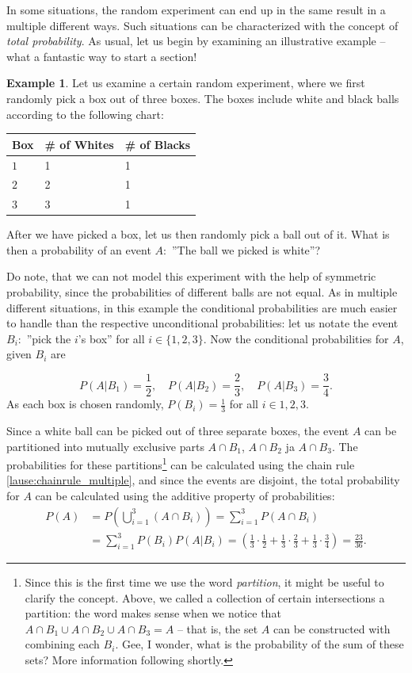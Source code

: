 \documentclass[12pt,a4paper,leqno]{report}
\theoremstyle{plain}
\theoremstyle{definition}
\newtheorem{esim}[equation]{Example}
\begin{document}
In some situations, the random experiment can end up in the same result in a multiple different ways. Such situations can be characterized with the concept of \emph{total probability}. As usual, let us begin by examining an illustrative example -- what a fantastic way to start a section! 

\begin{esim}
\label{esim:totalprob}
Let us examine a certain random experiment, where we first randomly pick a box out of three boxes. The boxes include white and black balls according to the following chart:

\bigskip

\begin{tabular}{l l l}
\toprule
 Box & \# of Whites & \# of Blacks \\
\midrule
$1$ & 1 & 1  \\
$2$ & 2 & 1 \\
$3$ & 3 & 1\\
\bottomrule 
\end{tabular}

\bigskip

After we have picked a box, let us then randomly pick a ball out of it. What is then a probability of an event $A:$ ''The ball we picked is white''?

Do note, that we can not model this experiment with the help of symmetric probability, since the probabilities of different balls are not equal. As in multiple different situations, in this example the conditional probabilities are much easier to handle than the respective unconditional probabilities: let us notate the event $B_i:$ ''pick the $i$'s box'' for all $i \in \{1,2,3\}$. Now the conditional probabilities for $A$, given $B_i$ are 

\[
P(A|B_1) = \frac{1}{2}, \quad P(A|B_2) = \frac{2}{3}, \quad P(A|B_3) = \frac{3}{4}.
\] 
As each box is chosen randomly, $P(B_i) = \frac{1}{3}$ for all $i \in {1,2,3}$. 

Since a white ball can be picked out of three separate boxes, the event $A$ can be partitioned into mutually exclusive parts $A\cap B_1$, $A\cap B_2$ ja $A\cap B_3$. 
The probabilities for these partitions\footnote{Since this is the first time we use the word \emph{partition}, it might be useful to clarify the concept. Above, we called a collection of certain intersections a partition: the word makes sense when we notice that $A\cap B_1 \cup A\cap B_2 \cup A\cap B_3 = A$ -- that is, the set $A$ can be constructed with combining each $B_i$. Gee, I wonder, what is the probability of the sum of these sets? More information following shortly.} can be calculated using the chain rule \ref{lause:chainrule_multiple}, and since the events are disjoint, the total probability for $A$ can be calculated using the additive property of probabilities:
\[
\begin{split}
P(A) &= P\left( \bigcup_{i=1}^3 (A \cap B_i)\right)= \sum_{i=1}^3 P(A \cap B_i) \\
&= \sum_{i=1}^3 P(B_i) P(A|B_i) = \left(\frac{1}{3} \cdot \frac{1}{2} + \frac{1}{3} \cdot \frac{2}{3} + \frac{1}{3} \cdot \frac{3}{4} \right) = \frac{23}{36}.
\end{split}
\]
\end{esim}
\end{document}
